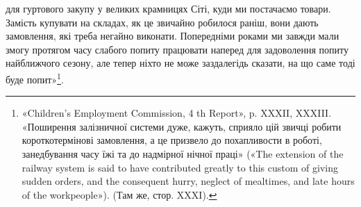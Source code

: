 для гуртового закупу у великих крамницях Сіті, куди ми постачаємо товари. Замість купувати на
складах, як це звичайно робилося раніш, вони дають замовлення, які треба негайно виконати.
Попередніми роками ми завжди мали змогу протягом часу
слабого попиту працювати наперед для задоволення попиту найближчого сезону, але тепер ніхто не може
заздалегідь сказати,
на що саме тоді буде попит»\footnote{
«Children’s Employment Commission, 4 th Report», p. XXXII,
XXXIII. «Поширення залізничної системи дуже, кажуть, сприяло цій
звичці робити короткотермінові замовлення, а це призвело до похапливости в роботі, занедбування часу
їжі та до надмірної нічної праці»
(«The extension of the railway system is said to have contributed greatly
to this custom of giving sudden orders, and the consequent hurry, neglect
of mealtimes, and late hours of the workpeople»). (Там же, стор. XXXI).
}.
